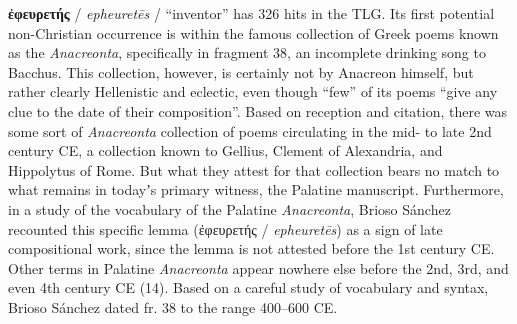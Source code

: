\noindent{}\textbf{ἐφευρετής} / \textit{epheuretēs} / “inventor” %
has 326 hits in the TLG. %
Its first potential non-Christian occurrence is within %
the famous collection of Greek poems known as the \textit{Anacreonta}, %
specifically in fragment 38, an incomplete drinking song to Bacchus.
This collection, however, is certainly not by Anacreon himself, %
but rather clearly Hellenistic and eclectic, even though “few” of its %
poems “give any clue to the date of their composition”. %
Based on reception and citation, %
there was some sort of \textit{Anacreonta} collection of poems circulating in the mid- to late 2nd century CE, %
a collection known to Gellius, Clement of Alexandria, and Hippolytus of Rome. %
But what they attest for that collection bears no match to what remains in todayʼs primary witness, %
the Palatine manuscript. %
Furthermore, in a study of the vocabulary of the Palatine \textit{Anacreonta}, %
Brioso Sánchez recounted this specific lemma (ἐφευρετής / \textit{epheuretēs}) as a sign of late compositional work, %
since the lemma is not attested before the 1st century CE. %
Other terms in Palatine \textit{Anacreonta} appear nowhere else before the 2nd, 3rd, and even 4th century CE (14). %
Based on a careful study of vocabulary and syntax, Brioso Sánchez dated fr. 38 to the range 400--600 CE. %
